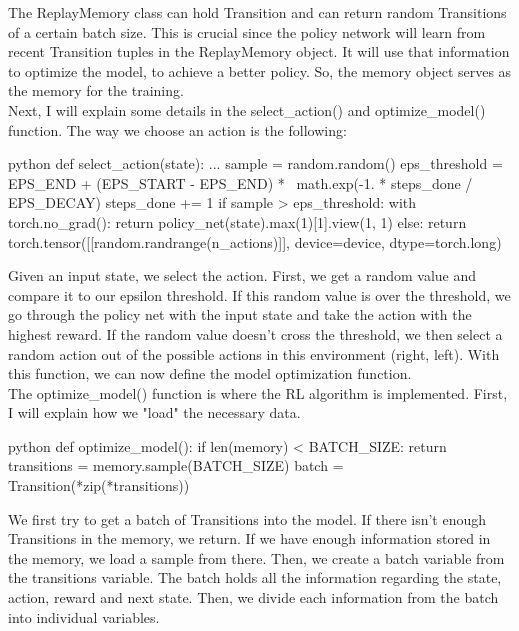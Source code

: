 \documentclass{article}
\numberwithin{equation}{section}
\numberwithin{equation}{section}
\begin{document}
The ReplayMemory class can hold Transition and  can return random Transitions of a certain batch size. This is crucial since the policy network will learn from recent Transition tuples in the ReplayMemory object. It will use that information to optimize the model, to achieve a better policy. So, the memory object serves as the memory for the training.\\

Next, I will explain some details in the select\_action() and optimize\_model() function. The way we choose an action is the following:

\begin{mintedbox}{python}
def select_action(state):
...
    sample = random.random()
    eps_threshold = EPS_END + (EPS_START - EPS_END) * \
        math.exp(-1. * steps_done / EPS_DECAY)
    steps_done += 1
    if sample > eps_threshold:
        with torch.no_grad():
            return policy_net(state).max(1)[1].view(1, 1)
    else:
        return torch.tensor([[random.randrange(n_actions)]], device=device, dtype=torch.long)
\end{mintedbox}
Given an input state, we select the action. First, we get a random value and compare it to our epsilon threshold. If this random value is over the threshold, we go through the policy net with the input state and take the action with the highest reward. If the random value doesn't cross the threshold, we then select a random action out of the possible actions in this environment (right, left). With this function, we can now define the model optimization function. \\

The optimize\_model() function is where the RL algorithm is implemented. First, I will explain how we "load" the necessary data.

\begin{mintedbox}{python}
def optimize_model():
    if len(memory) < BATCH_SIZE:
        return
    transitions = memory.sample(BATCH_SIZE)
    batch = Transition(*zip(*transitions))
\end{mintedbox}

We first try to get a batch of Transitions into the model. If there isn't enough Transitions in the memory, we return. If we have enough information stored in the memory, we load a sample from there. Then, we create a batch variable from the transitions variable. The batch holds all the information regarding the state, action, reward and next state. Then, we divide each information from the batch into individual variables.
\end{document}
